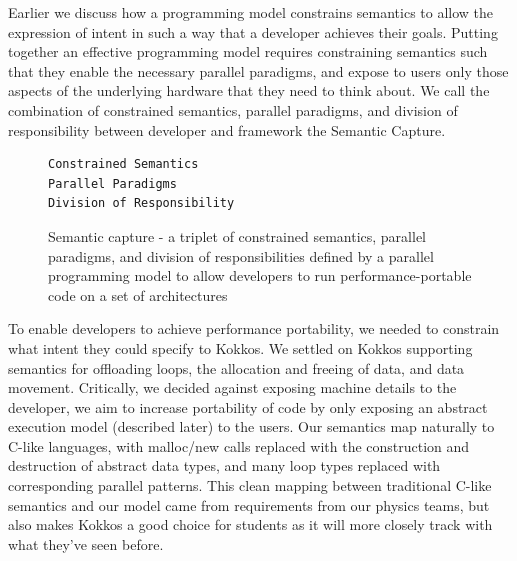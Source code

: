 Earlier we discuss how a programming model constrains semantics to allow the expression of intent in such a way that a developer achieves their goals. Putting together an effective programming model requires constraining semantics such that they enable the necessary parallel paradigms, and expose to users only those aspects of the underlying hardware that they need to think about. We call the combination of constrained semantics, parallel paradigms, and division of responsibility between developer and framework the Semantic Capture.

\begin{figure}[h]
\begin{Verbatim}[frame=leftline]
Constrained Semantics
Parallel Paradigms 
Division of Responsibility
\end{Verbatim}
\caption{Semantic capture - a triplet of constrained semantics, parallel paradigms, and division of responsibilities defined by a parallel programming model to allow developers to run performance-portable code on a set of architectures}
\label{figSemCapture}
\end{figure}


To enable developers to achieve performance portability, we needed to constrain what intent they could specify to Kokkos. We settled on Kokkos supporting semantics for offloading loops, the allocation and freeing of data, and data movement. Critically, we decided against exposing machine details to the developer, we aim to increase portability of code by only exposing an abstract execution model (described later) to the users. Our semantics map naturally to C-like languages, with malloc/new calls replaced with the construction and destruction of abstract data types, and many loop types replaced with corresponding parallel patterns. This clean mapping between traditional C-like semantics and our model came from requirements from our physics teams, but also makes Kokkos a good choice for students as it will more closely track with what they've seen before.

